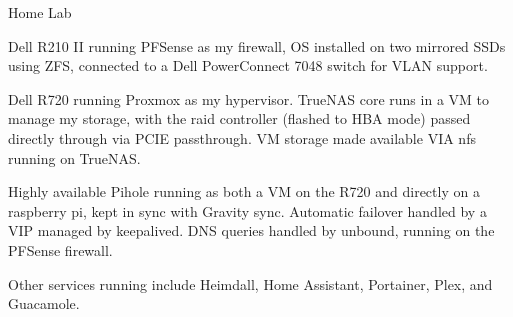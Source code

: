 \begin{cventries}
  \cventry
    {} %
    {Home Lab} %
    {} %
    {} %
    {
      \begin{cvitems} %
        \item {Dell R210 II running PFSense as my firewall, OS installed on two mirrored SSDs using ZFS, connected to a Dell PowerConnect 7048 switch for VLAN support.}
        \item {Dell R720 running Proxmox as my hypervisor. TrueNAS core runs in a VM to manage my storage, with the raid controller (flashed to HBA mode) passed directly through via PCIE passthrough. VM storage made available VIA nfs running on TrueNAS.}
        \item {Highly available Pihole running as both a VM on the R720 and directly on a raspberry pi, kept in sync with Gravity sync. Automatic failover handled by a VIP managed by keepalived. DNS queries handled by unbound, running on the PFSense firewall.}
        \item {Other services running include Heimdall, Home Assistant, Portainer, Plex, and Guacamole.}
      \end{cvitems}
    }

\end{cventries}
